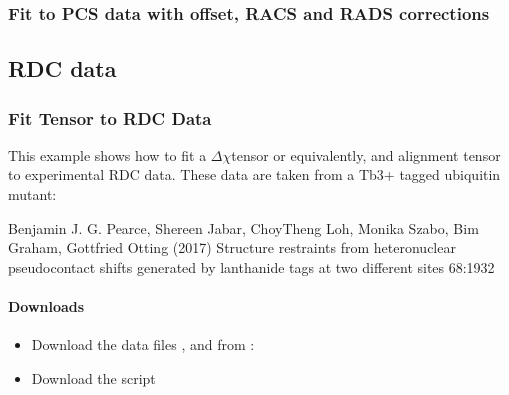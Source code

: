\documentclass[a4paper,10pt,english,openany,oneside]{sphinxmanual}
\begin{document}
\subsubsection{Fit to PCS data with offset, RACS and RADS corrections}
\label{\detokenize{examples/pcs_fit_advanced_corrections:fit-to-pcs-data-with-offset-racs-and-rads-corrections}}\label{\detokenize{examples/pcs_fit_advanced_corrections:pcs-fit-advanced-corrections}}\label{\detokenize{examples/pcs_fit_advanced_corrections::doc}}

\subsection{RDC data}
\label{\detokenize{examples/index:rdc-data}}

\subsubsection{Fit Tensor to RDC Data}
\label{\detokenize{examples/rdc_fit:fit-tensor-to-rdc-data}}\label{\detokenize{examples/rdc_fit:rdc-fit}}\label{\detokenize{examples/rdc_fit::doc}}
\sphinxAtStartPar
This example shows how to fit a \({\Delta\chi}\)\sphinxhyphen{}tensor or equivalently, and alignment tensor to experimental RDC data. These data are taken from a Tb3+ tagged ubiquitin mutant:

\sphinxAtStartPar
Benjamin J. G. Pearce, Shereen Jabar, Choy\sphinxhyphen{}Theng Loh, Monika Szabo, Bim Graham, Gottfried Otting (2017) Structure restraints from heteronuclear pseudocontact shifts generated by lanthanide tags at two different sites  68:19\sphinxhyphen{}32


\paragraph{Downloads}
\label{\detokenize{examples/rdc_fit:downloads}}\begin{itemize}
\item {} 
\sphinxAtStartPar
Download the data files ,  and  from :

\item {} 
\sphinxAtStartPar
Download the script 

\end{itemize}
\end{document}
